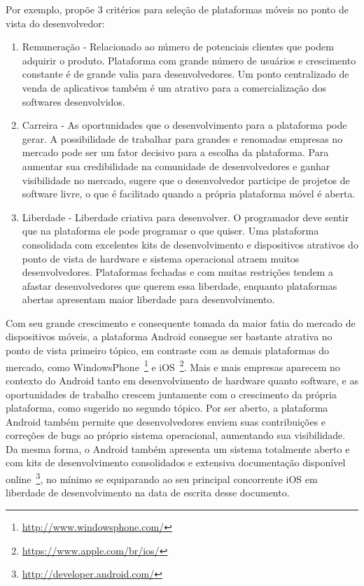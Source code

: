  Por exemplo, propõe 3 critérios para seleção de plataformas móveis no ponto de vista do desenvolvedor:
\begin{enumerate}
\item Remuneração - Relacionado ao número de potenciais clientes que podem adquirir o produto. Plataforma com grande número de usuários e crescimento constante é de grande valia para desenvolvedores. Um ponto centralizado de venda de aplicativos também é um atrativo para a comercialização dos softwares desenvolvidos.
\item Carreira - As oportunidades que o desenvolvimento para a plataforma pode gerar. A possibilidade de trabalhar para grandes e renomadas empresas no mercado pode ser um fator decisivo para a escolha da plataforma. Para aumentar sua credibilidade na comunidade de desenvolvedores e ganhar visibilidade no mercado,  sugere que o desenvolvedor participe de projetos de software livre, o que é facilitado quando a própria plataforma móvel é aberta.
\item Liberdade - Liberdade criativa para desenvolver. O programador deve sentir que na plataforma ele pode programar o que quiser. Uma plataforma consolidada com excelentes kits de desenvolvimento e dispositivos atrativos do ponto de vista de hardware e sistema operacional atraem muitos desenvolvedores. Plataformas fechadas e com muitas restrições tendem a afastar desenvolvedores que querem essa liberdade, enquanto plataformas abertas apresentam maior liberdade para desenvolvimento.
\end{enumerate}

Com seu grande crescimento e consequente tomada da maior fatia do mercado de dispositivos móveis, a plataforma Android consegue ser bastante atrativa no ponto de vista primeiro tópico, em contraste com as demais plataformas do mercado, como WindowsPhone~\footnote{\url{http://www.windowsphone.com/}} e iOS~\footnote{\url{https://www.apple.com/br/ios/}}. Mais e mais empresas aparecem no contexto do Android tanto em desenvolvimento de hardware quanto software, e as oportunidades de trabalho crescem juntamente com o crescimento da própria plataforma, como sugerido no segundo tópico. Por ser aberto, a plataforma Android também permite que desenvolvedores enviem suas contribuições e correções de bugs ao próprio sistema operacional, aumentando sua visibilidade. Da mesma forma, o Android também apresenta um sistema totalmente aberto e com kits de desenvolvimento consolidados e extensiva documentação disponível online~\footnote{\url{http://developer.android.com/}}, no mínimo se equiparando ao seu principal concorrente iOS em liberdade de desenvolvimento na data de escrita desse documento.

